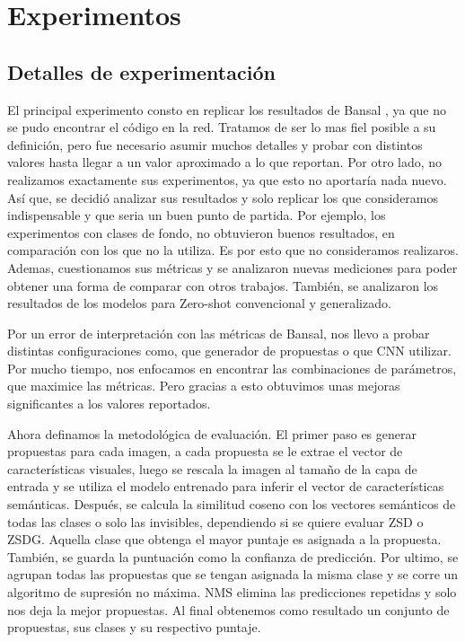 \chapter{Experimentos}\label{cap:experimentos}

\section{Detalles de experimentación}
El principal experimento consto en replicar los resultados de Bansal \cite{bansal2018zero}, ya que no se pudo encontrar el código en la red. Tratamos de ser lo mas fiel posible a su definición, pero fue necesario asumir muchos detalles y probar con distintos valores hasta llegar a un valor aproximado a lo que reportan. Por otro lado, no realizamos exactamente sus experimentos, ya que esto no aportaría nada nuevo. Así que, se decidió analizar sus resultados y solo replicar los que consideramos indispensable y que seria un buen punto de partida. Por ejemplo, los experimentos con clases de fondo, no obtuvieron buenos resultados, en comparación con los que no la utiliza. Es por esto que no consideramos realizaros. Ademas, cuestionamos sus métricas y se analizaron nuevas mediciones para poder obtener una forma de comparar con otros trabajos. También, se analizaron los resultados de los modelos para Zero-shot convencional y generalizado.

Por un error de interpretación con las métricas de Bansal, nos llevo a probar distintas configuraciones como, que generador de propuestas o que CNN utilizar. Por mucho tiempo, nos enfocamos en encontrar las combinaciones de parámetros, que maximice las métricas. Pero gracias a esto obtuvimos unas mejoras significantes a los valores reportados.

Ahora definamos la metodológica de evaluación. El primer paso es generar propuestas para cada imagen, a cada propuesta se le extrae el vector de características visuales, luego se rescala la imagen al tamaño de la capa de entrada y se utiliza el modelo entrenado para inferir el vector de características semánticas. Después, se calcula la similitud coseno con los vectores semánticos de todas las clases o solo las invisibles, dependiendo si se quiere evaluar ZSD o ZSDG. Aquella clase que obtenga el mayor puntaje es asignada a la propuesta. También, se guarda la puntuación como la confianza de predicción.  Por ultimo, se agrupan todas las propuestas que se tengan asignada la misma clase y se corre un algoritmo de supresión no máxima. NMS elimina las predicciones repetidas y solo nos deja la mejor propuestas. Al final obtenemos como resultado un conjunto de propuestas, sus clases y su respectivo puntaje. \\
 

